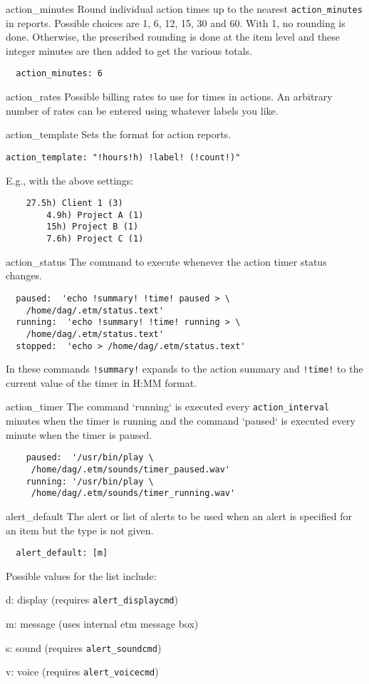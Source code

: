 \documentclass[9pt,landscape]{article}
\begin{document}
\begin{multicols}{3}
\begin{compactdesc}
\item[action\_minutes] Round individual action times up to the nearest \verb!action_minutes! in reports. Possible choices are 1, 6, 12, 15, 30 and 60. With 1, no rounding is done. Otherwise, the prescribed rounding is done at the item level and these integer minutes are then added to get the various totals.
\begin{verbatim}
  action_minutes: 6
\end{verbatim}

\item[action\_rates] Possible billing rates to use for times in actions. An arbitrary number of rates can be entered using whatever labels you like.

\item[action\_template] Sets the format for action reports.
\begin{verbatim}
action_template: "!hours!h) !label! (!count!)"
\end{verbatim}
E.g., with the above settings:
\begin{verbatim}
    27.5h) Client 1 (3)
        4.9h) Project A (1)
        15h) Project B (1)
        7.6h) Project C (1)
\end{verbatim}

\item[action\_status] The command to execute whenever the action timer status changes.
\begin{verbatim}
  paused:  'echo !summary! !time! paused > \
    /home/dag/.etm/status.text'
  running:  'echo !summary! !time! running > \
    /home/dag/.etm/status.text'
  stopped:  'echo > /home/dag/.etm/status.text'
\end{verbatim}
In these commands \verb'!summary!' expands to the action summary and \verb'!time!' to the current value of the timer in H:MM format.

\item[action\_timer] The command `running` is executed every \verb'action_interval' minutes when the timer is running and the command `paused` is executed every minute when the timer is paused.
\begin{verbatim}
    paused:  '/usr/bin/play \
     /home/dag/.etm/sounds/timer_paused.wav'
    running: '/usr/bin/play \
     /home/dag/.etm/sounds/timer_running.wav'
\end{verbatim}

\item[alert\_default] The alert or list of alerts to be used when an alert is specified for an item but the type is not given.
\begin{verbatim}
  alert_default: [m]
\end{verbatim}
Possible values for the list include:
\begin{compactdesc}
\item[d:] display (requires \verb!alert_displaycmd!)
\item[m:] message (uses internal etm message box)
\item[s:] sound (requires \verb!alert_soundcmd!)
\item[v:] voice (requires \verb!alert_voicecmd!)
\end{compactdesc}


\end{compactdesc}
\end{multicols}
\end{document}
